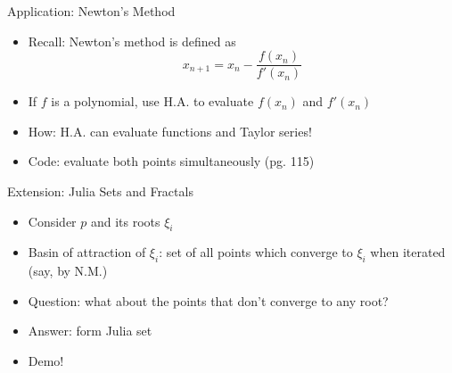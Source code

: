 \documentclass[9pt, serif]{beamer}
\newcommand{\bi}{\begin{itemize}}
\newcommand{\ei}{\end{itemize}}
\begin{document}
\begin{frame}{Application: Newton's Method}
	\bi
		\item Recall: Newton's method is defined as $$x_{n+1} = x_n - \frac{f(x_n)}{f'(x_n)}$$
		\pause
		\item If $f$ is a polynomial, use H.A. to evaluate $f(x_n)$ and $f'(x_n)$
		\pause
		\item How: H.A. can evaluate functions and Taylor series!
		\pause
		\item Code: evaluate both points simultaneously (pg. 115)
	\ei
\end{frame}


\begin{frame}{Extension: Julia Sets and Fractals}
	\bi
		\item Consider $p$ and its roots $\xi_i$
		\pause
		\item Basin of attraction of $\xi_i$: set of all points which converge to $\xi_i$ when iterated (say, by N.M.)
		\pause
		\item Question: what about the points that don't converge to any root?
		\pause
		\item Answer: form Julia set
		\pause
		\item Demo!
	\ei
\end{frame}
\end{document}

